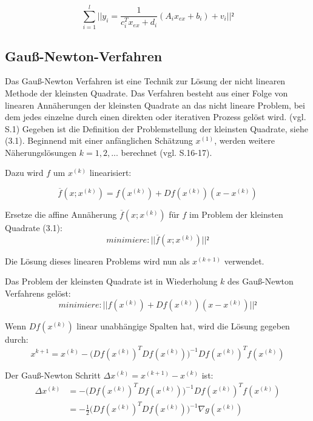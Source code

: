 \begin{equation}
\sum_{i=1}^l || y_i = \frac{1}{c_i^T x_{ex}+d_i}(A_i x_{ex} + b_i) + v_i||²
\end{equation}

\subsection{Gauß-Newton-Verfahren}

Das Gauß-Newton Verfahren ist eine Technik zur Lösung der nicht linearen Methode der kleinsten Quadrate. Das Verfahren besteht aus einer Folge von linearen Annäherungen der kleinsten Quadrate an das nicht lineare Problem, bei dem jedes einzelne durch einen direkten oder iterativen Prozess gelöst wird. (vgl. \cite{approx_gn} S.1) Gegeben ist die Definition der Problemstellung der kleinsten Quadrate, siehe (3.1). Beginnend mit einer anfänglichen Schätzung $x^{(1)}$, werden weitere Näherungslösungen $k = 1,2,...$ berechnet (vgl. \cite{nonlinear_1} S.16-17).

Dazu wird $f$ um $x^{(k)}$ linearisiert:

\begin{equation}
\overline{f}(x;x^{(k)}) = f(x^{(k)})+Df(x^{(k)})(x-x^{(k)})
\end{equation}

Ersetze die affine Annäherung $ \overline{f}(x;x^{(k)})$ für $f$ im Problem der kleinsten Quadrate (3.1):
\begin{equation}
minimiere: ||\overline{f}(x;x^{(k)})||²
\end{equation}

Die Lösung dieses linearen Problems wird nun als $x^{(k+1)}$ verwendet. 

Das Problem der kleinsten Quadrate ist in Wiederholung $k$ des Gauß-Newton Verfahrens gelöst:
\begin{equation}
minimiere: ||f(x^{(k)}) + Df(x^{(k)})(x-x^{(k)})||²
\end{equation}

Wenn $Df(x^{(k)}) $ linear unabhängige Spalten hat, wird die Lösung gegeben durch:
\begin{equation}
x^{k+1} = x^{(k)}-\Big(Df(x^{(k)})^TDf(x^{(k)})\Big)^{-1} Df(x^{(k)})^T f(x^{(k)})
\end{equation}

Der Gauß-Newton Schritt $\Delta x^{(k)} = x^{(k+1)} - x^{(k)}$ ist:
\begin{equation}
\begin{aligned}
\Delta x^{(k)} &= -\Big(Df(x^{(k)})^TDf(x^{(k)})\Big)^{-1} Df(x^{(k)})^T f(x^{(k)})\\ &= -\frac{1}{2} \Big(Df(x^{(k)})^TDf(x^{(k)})\Big)^{-1} \nabla g(x^{(k)})
\end{aligned}
\end{equation}

